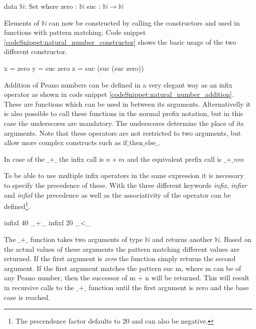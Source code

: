 \begin{codesnippet}[mathescape=true, caption={Definition of the peano natural numbers data type in Agda}, label={codeSnippet:natural_number}]
data $\mathbb{N}$: Set where
  zero : $\mathbb{N}$
  suc  : $\mathbb{N} \rightarrow \mathbb{N}$
\end{codesnippet}

Elements of $\mathbb{N}$ can now be constructed by calling the constructors and used in functions with pattern matching. 
Code snippet \ref{codeSnippet:natural_number_constructor} shows the basic usage of the two different constructor.

\begin{codesnippet}[mathescape=true, caption={Some peano numbers}, label={codeSnippet:natural_number_constructor}]
x = zero
y = suc zero
z = suc (suc (suc zero))
\end{codesnippet}

Addition of Peano numbers can be defined in a very elegant way as an infix operator as shown in code snippet \ref{codeSnippet:natural_number_addition}.
These are functions which can be used in between its arguments.
Alternativelly it is also possible to call these functions in the normal prefix notation, but in this case the underscores are mandatory.
The underscores determine the place of its arguments.
Note that these operators are not restricted to two arguments, but allow more complex constructs such as $\text{if\_then\_else\_}$.

In case of the $\text{\_+\_}$ the infix call is $n + m$ and the equivalent prefix call is $\text{\_+\_} n m$

To be able to use multiple infix operators in the same expression it is necessary to specify the precedence of these.
With the three different keywords \emph{infix}, \emph{infixr} and \emph{infixl} the precedence as well as the associativity of the operator can be defined\footnote{The precendence factor defaults to 20 and can also be negative.}.

\begin{codesnippet}[mathescape=true, caption={Precedence and associativity of some Peano number operators}, label={codeSnippet:natural_number_precedence}]
infixl 40 _+_
infixl 20 _<_
\end{codesnippet}

The $\text{\_+\_}$ function takes two arguments of type $\mathbb{N}$ and returns another $\mathbb{N}$.
Based on the actual values of these arguments the pattern matching different values are returned.
If the first argument is \emph{zero} the function simply returns the second argument.
If the first argument matches the pattern suc m, where m can be of any Peano number, then the successor of m + n will be returned.
This will result in recursive calls to the $\text{\_+\_}$  function until the first argument is zero and the base case is reached.

